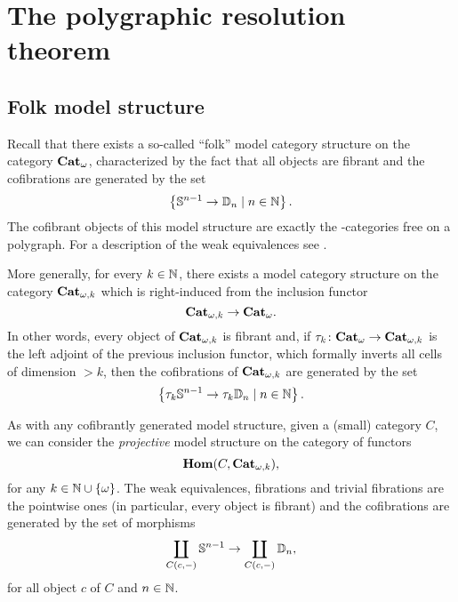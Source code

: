 \section{The polygraphic resolution theorem}

\subsection{Folk model structure}
\begin{paragr}
  Recall that there exists a so-called ``folk'' model category
  structure on the category $\mathbf{Cat}_{\omega}$, characterized by the fact that
  all objects are fibrant and the cofibrations are generated by the
  set
  \[
    \left\{ \mathbb{S}^{n-1} \to \mathbb{D}_{n} \; | \; n \in \mathbb N\right\}.
  \]
  The cofibrant objects of this model structure are exactly the
  \oo\nbd-categories free on a polygraph. For a description of the
  weak equivalences see \cite{}. 
\end{paragr}
\begin{paragr}
  More generally, for every $k \in \mathbb N$, there exists a model
  category structure on the category $\mathbf{Cat}_{\omega,k}$ which is
  right-induced from the inclusion functor
  \[
    \mathbf{Cat}_{\omega,k} \to \mathbf{Cat}_{\omega}.
  \]
  In other words, every object of $\mathbf{Cat}_{\omega,k}$ is fibrant and, if
  $\tau_{k} \colon \mathbf{Cat}_{\omega} \to \mathbf{Cat}_{\omega,k}$ is the left adjoint of the
  previous inclusion functor, which formally inverts all cells of
  dimension $> k $, then the cofibrations of $\mathbf{Cat}_{\omega,k}$ are generated
  by the set 
  \[
    \left\{ \tau_{k}\mathbb{S}^{n-1} \to \tau_{k}\mathbb{D}_{n} \; | \; n \in \mathbb N\right\}.
  \]
\end{paragr}

\begin{paragr}
  As with any cofibrantly generated model structure, given a (small)
  category $C$, we can consider the \emph{projective} model structure
  on the category of functors
  \[
    \mathbf{Hom}(C,\mathbf{Cat}_{\omega,k}),
  \]
  for any $k \in \mathbb N\cup\{\omega\}$. The weak equivalences, fibrations
  and trivial fibrations are the pointwise ones (in particular, every
  object is fibrant) and the cofibrations are generated by the set of
  morphisms
  \[
    \coprod_{C(c,-)}\mathbb{S}^{n-1} \to \coprod_{C(c,-)}\mathbb{D}_{n},
  \]
  for all object $c$ of $C$ and $n \in \mathbb N$.
\end{paragr}
